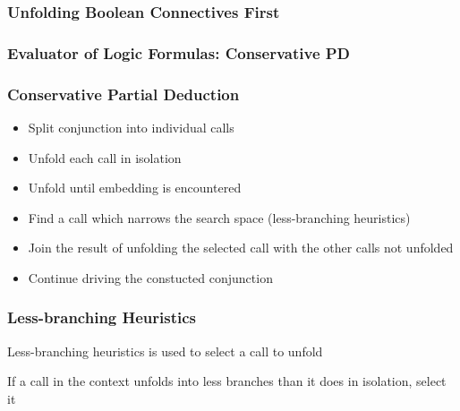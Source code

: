 \documentclass[xcolor=table]{beamer}
\begin{document}
\begin{frame}[fragile]
  \frametitle{Unfolding Boolean Connectives First}

\begin{center}
  
\end{center}
\end{frame}

\begin{frame}[fragile]
  \frametitle{Evaluator of Logic Formulas: Conservative PD}

\begin{center}
  
\end{center}
\end{frame}

\begin{frame}[fragile]
  \frametitle{Conservative Partial Deduction}
\begin{itemize}
  \item Split conjunction into individual calls
  \item Unfold each call in isolation
  \item Unfold until embedding is encountered
  \item Find a call which narrows the search space (less-branching heuristics)
  \item Join the result of unfolding the selected call with the other calls not unfolded
  \item Continue driving the constucted conjunction
\end{itemize}

\end{frame}

\begin{frame}[fragile]
  \frametitle{Less-branching Heuristics}

  \begin{center}
    Less-branching heuristics is used to select a call to unfold

    \vspace{0.5cm}

    If a call in the context unfolds into less branches than it does in isolation, select it
  \end{center}

\vspace{0.5cm}


  \begin{columns}
    \begin{column}[]{0.65\textwidth}
      \begin{center}
        
      \end{center}
    \end{column}
    \begin{column}[]{0.35\textwidth}
      
    \end{column}
  \end{columns}
\end{frame}
\end{document}
